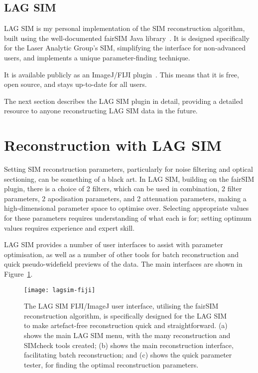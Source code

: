 
\subsection{LAG SIM}
LAG SIM is my personal implementation of the SIM reconstruction algorithm, built using the well-documented fairSIM Java library~\cite{fairsimGithub}. 
It is designed specifically for the Laser Analytic Group's SIM, simplifying the interface for non-advanced users, and implements a unique parameter-finding technique.

It is available publicly as an ImageJ/FIJI plugin~\cite{lagsim}.
This means that it is free, open source, and stays up-to-date for all users. 

The next section describes the LAG SIM plugin in detail, providing a detailed resource to anyone reconstructing LAG SIM data in the future.

\section{Reconstruction with LAG SIM} \label{sec:lagsimFiji}
Setting SIM reconstruction parameters, particularly for noise filtering and optical sectioning, can be something of a black art.
In LAG SIM, building on the fairSIM plugin, there is a choice of 2 filters, which can be used in combination, 2 filter parameters, 2 apodisation parameters, and 2 attenuation parameters, making a high-dimensional parameter space to optimise over. 
Selecting appropriate values for these parameters requires understanding of what each is for; setting optimum values requires experience and expert skill.

LAG SIM provides a number of user interfaces to assist with parameter optimisation, as well as a number of other tools for batch reconstruction and quick pseudo-widefield previews of the data. 
The main interfaces are shown in Figure~\ref{fig:lagsim-fiji-interface}. 

\begin{figure}[htbp!]
	\centering
		\texttt{[image: lagsim-fiji]}	
	\caption[LAG SIM: A Fiji interface makes artefact-free reconstruction quick and simple for non-expert users]{The LAG SIM FIJI/ImageJ user interface, utilising the fairSIM reconstruction algorithm, is specifically designed for the LAG SIM to make artefact-free reconstruction quick and straightforward. (a) shows the main LAG SIM menu, with the many reconstruction and SIMcheck tools created; (b) shows the main reconstruction interface, facilitating batch reconstruction; and (c) shows the quick parameter tester, for finding the optimal reconstruction parameters. } %
\label{fig:lagsim-fiji-interface}
\end{figure}


